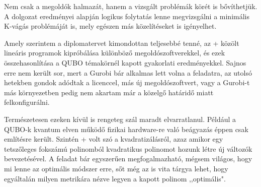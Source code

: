 Nem csak a megoldók halmazát, hanem a vizsgált problémák körét is bővíthetjük. A dolgozat eredményei alapján logikus folytatás lenne megvizsgálni a minimális K-vágás problémáját is, mely egészen más közelítéseket is igényelhet.

Amely szerintem a diplomatervet kimondottan teljesebbé tenné, az \az+ közölt lineáris programok kipróbálása különböző megoldószoftverekkel, és ezek összehasonlítása a QUBO témakörnél kapott gyakorlati eredményekkel. Sajnos erre nem került sor, mert a Gurobi bár alkalmas lett volna a feladatra, az utolsó hetekben gondok adódtak a licenccel, más új  megoldószoftvert, vagy a Gurobi-t más környezetben pedig nem akartam már a közelgő határidő miatt felkonfigurálni.

Természetesen ezeken kívül is rengeteg szál maradt elvarratlanul. Például a QUBO-k kvantum elven működő fizikai hardware-re való beágyazás éppen csak említésre került. Szintén \az+ volt szó a kvadratizálásról, azaz amikor egy tetszőleges fokszámú polinomból kvadratikus polinomot hozunk létre új változók bevezetésével. A feladat bár egyszerűen megfogalmazható, mégsem világos, hogy mi lenne az optimális módszer erre, sőt még az is vita tárgya lehet, hogy egyáltalán milyen metrikára nézve legyen a kapott polinom ,,optimális".